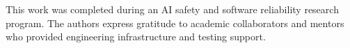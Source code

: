 \documentclass[runningheads]{llncs}
\begin{document}
\begin{credits}
\subsubsection{\ackname} 
This work was completed during an AI safety and software reliability research program. The authors express gratitude to academic collaborators and mentors who provided engineering infrastructure and testing support.
\subsubsection{\discintname} 
\end{credits}

\newpage


\end{document}
